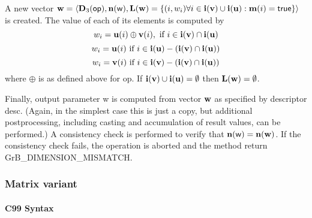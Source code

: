 A new vector ${\bf w} = \langle \bold{D}_3({\sf op}),
\bold{n}({\bf \sf w}), \bold{L}({\bf w}) = \{(i,w_i)  \forall i \in
{\bf i}({\bf v}) \cup {\bf i}({\bf u}) : {\bf m}(i)
= {\sf true} \} \rangle$ is created.  The value of each of its
elements is computed by 
\[
w_i = {\bf u}(i) \oplus {\bf v}(i), \ \mbox{if}\  i \in  {\bf i}({\bf v}) \cap {\bf i}({\bf u})
\]
\[
w_i = {\bf u}(i) \ \mbox{if}\  i \in  {\bf i}({\bf u}) - ({\bf i}({\bf v}) \cap {\bf i}({\bf u}))
\]
\[
w_i = {\bf v}(i) \ \mbox{if}\  i \in  {\bf i}({\bf v}) - ({\bf i}({\bf v}) \cap {\bf i}({\bf u}))
\]
where $\oplus$ is as defined above for {\sf op}.
If ${\bf i}({\bf v}) \cup {\bf i}({\bf u}) = \emptyset$
then $\bold{L}({\bf w}) = \emptyset$.

Finally, output parameter {\sf w} is computed from vector ${\bf w}$
as specified by descriptor {\sf desc}. (Again, in the simplest case this
is just a copy, but additional postprocessing, including casting and
accumulation of result values, can be performed.)  A consistency check is
performed to verify that $\bold{n}({\sf w}) = \bold{n}({\bf w})$. If
the consistency check fails, the operation is aborted and the method
return {\sf GrB\_DIMENSION\_MISMATCH}.


\subsubsection{Matrix variant}


\paragraph{C99 Syntax}

